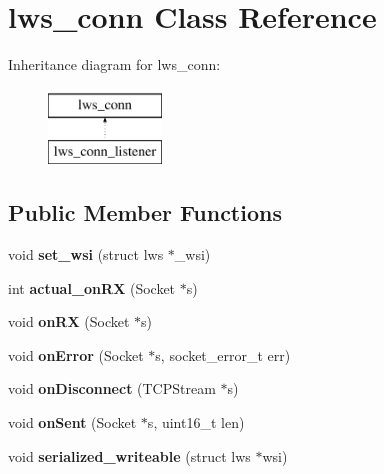 \hypertarget{classlws__conn}{}\section{lws\+\_\+conn Class Reference}
\label{classlws__conn}
Inheritance diagram for lws\+\_\+conn\+:\begin{figure}[H]
\begin{center}
\leavevmode
\includegraphics[height=2.000000cm]{classlws__conn}
\end{center}
\end{figure}
\subsection*{Public Member Functions}
\begin{DoxyCompactItemize}
\item 
void {\bfseries set\+\_\+wsi} (struct lws $\ast$\+\_\+wsi)\hypertarget{classlws__conn_afe73e53da2070f659ad6e7fd14878c7e}{}\label{classlws__conn_afe73e53da2070f659ad6e7fd14878c7e}

\item 
int {\bfseries actual\+\_\+on\+RX} (Socket $\ast$s)\hypertarget{classlws__conn_aef530971372f55e862f2e09bc98f1029}{}\label{classlws__conn_aef530971372f55e862f2e09bc98f1029}

\item 
void {\bfseries on\+RX} (Socket $\ast$s)\hypertarget{classlws__conn_aba42bdd763a36c3a331b62410969b6ba}{}\label{classlws__conn_aba42bdd763a36c3a331b62410969b6ba}

\item 
void {\bfseries on\+Error} (Socket $\ast$s, socket\+\_\+error\+\_\+t err)\hypertarget{classlws__conn_a4fb477fad697ce1faf8ec7a884ea6c6b}{}\label{classlws__conn_a4fb477fad697ce1faf8ec7a884ea6c6b}

\item 
void {\bfseries on\+Disconnect} (T\+C\+P\+Stream $\ast$s)\hypertarget{classlws__conn_a49f87612c6a3098cd1587f8382b8c85b}{}\label{classlws__conn_a49f87612c6a3098cd1587f8382b8c85b}

\item 
void {\bfseries on\+Sent} (Socket $\ast$s, uint16\+\_\+t len)\hypertarget{classlws__conn_aad7d2406618e560114650a91c729a596}{}\label{classlws__conn_aad7d2406618e560114650a91c729a596}

\item 
void {\bfseries serialized\+\_\+writeable} (struct lws $\ast$wsi)\hypertarget{classlws__conn_accc57581269c554291dac840ed135231}{}\label{classlws__conn_accc57581269c554291dac840ed135231}

\end{DoxyCompactItemize}
